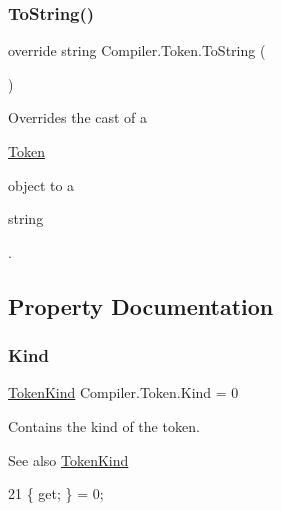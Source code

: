 \subsubsection{\texorpdfstring{To\+String()}{ToString()}}
{\footnotesize\ttfamily override string Compiler.\+Token.\+To\+String (\begin{DoxyParamCaption}{ }\end{DoxyParamCaption})}

Overrides the cast of a
\begin{DoxyCode}
\mbox{\hyperlink{class_compiler_1_1_token_aab9c8427bb691c0e674d0f1fdd5b1fbd}{Token}} 
\end{DoxyCode}
 object to a
\begin{DoxyCode}
\textcolor{keywordtype}{string} 
\end{DoxyCode}
 . 


\subsection{Property Documentation}
\mbox{\label{class_compiler_1_1_token_a181f032615da51df5a5a0223532cfe9f}} 
\subsubsection{\texorpdfstring{Kind}{Kind}}
{\footnotesize\ttfamily \mbox{\hyperlink{namespace_compiler_a57929962f25004759596fc3f13cf563c}{Token\+Kind}} Compiler.\+Token.\+Kind = 0\hspace{0.3cm}{\ttfamily [get]}}

Contains the kind of the token. \begin{DoxySeeAlso}{See also}
\mbox{\hyperlink{namespace_compiler_a57929962f25004759596fc3f13cf563c}{Token\+Kind}} 
\end{DoxySeeAlso}

\begin{DoxyCode}
21 \{ \textcolor{keyword}{get}; \} = 0;
\end{DoxyCode}
\mbox{\label{class_compiler_1_1_token_aefe43b7285f8982f636556b611cdbd5e}} 
